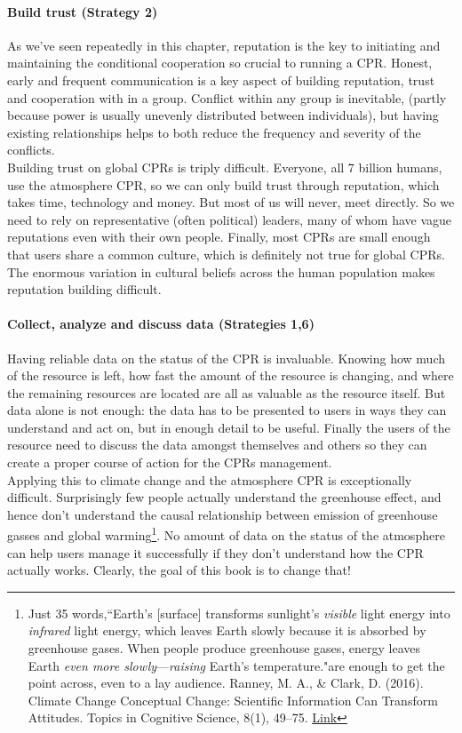 \documentclass[amstex,12pt]{book}
\begin{document}
\paragraph{Build trust (Strategy 2)}
As we've seen repeatedly in this chapter, reputation is the key to initiating and maintaining the conditional cooperation so crucial to running a CPR. Honest, early and frequent communication is a key aspect of building reputation, trust and cooperation with in a group. Conflict within any group is inevitable, (partly because power is usually unevenly distributed between individuals), but having existing relationships helps to both reduce the frequency and severity of the conflicts.\\

Building trust on global CPRs is triply difficult. Everyone, all 7 billion humans, use the atmosphere CPR, so we can only build trust through reputation, which takes time, technology and money. But most of us will never, meet directly. So we need to rely on representative (often political) leaders, many of whom have vague reputations even with their own people. Finally, most CPRs are small enough that users share a common culture, which is definitely not true for global CPRs. The enormous variation in cultural beliefs across the human population makes reputation building difficult.   

\paragraph{Collect, analyze and discuss data (Strategies 1,6)}
Having reliable data on the status of the CPR is invaluable. Knowing how much of the resource is left, how fast the amount of the resource is changing, and where the remaining resources are located are all as valuable as the resource itself. But data alone is not enough: the data has to be presented to users in ways they can understand and act on, but in enough detail to be useful. Finally the users of the resource need to discuss the data amongst themselves and others so they can create a proper course of action for the CPRs management.\\

Applying this to climate change and the atmosphere CPR is exceptionally difficult. Surprisingly few people actually understand the greenhouse effect, and hence don't understand the causal relationship between emission of greenhouse gasses and global warming\footnote{Just 35 words,``Earth's [surface] transforms sunlight’s \emph{visible} light energy into \emph{infrared} light energy, which leaves Earth slowly because it is absorbed by greenhouse gases. When people produce greenhouse gases, energy leaves Earth \emph{even more slowly}---\emph{raising} Earth’s temperature."are enough to  get the point across, even to a lay audience. Ranney, M. A., \& Clark, D. (2016). Climate Change Conceptual Change: Scientific Information Can Transform Attitudes. Topics in Cognitive Science, 8(1), 49–75. \href{https://doi.org/10.1111/tops.12187}{Link}}. No amount of data on the status of the atmosphere can help users manage it successfully if they don't understand how the CPR actually works. Clearly, the goal of this book is to change that!   
\end{document}
